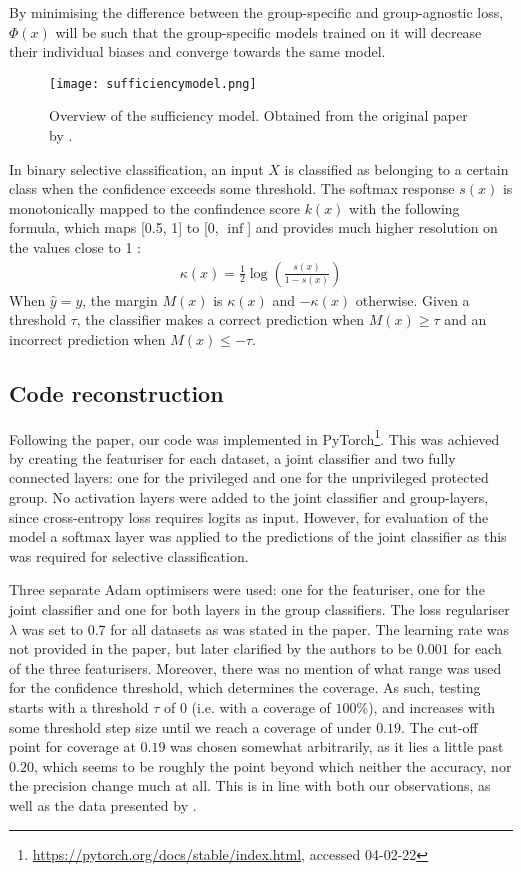 By minimising the difference between the group-specific and group-agnostic loss, $\Phi(x)$ will be such that the group-specific models trained on it will decrease their individual biases and converge towards the same model.
\begin{figure}[h!]
  \centering
  \texttt{[image: sufficiencymodel.png]}
    \caption{Overview of the sufficiency model. Obtained from the original paper by \citet{lee2021fair}.}
    \label{sufficiencymodel}
\end{figure}
In binary selective classification, an input $X$ is classified as belonging to a certain class when the confidence exceeds some threshold. The softmax response $s(x)$ is monotonically mapped to the confindence score $k(x)$ with the following formula, which maps [0.5, 1] to [0, $\inf$] and provides much higher resolution on the values close to 1 \citep{lee2021fair}:
\begin{align*}
    \kappa (x) = \frac{1}{2} \log \left( \frac{s(x)}{1-s(x)} \right)
\end{align*}
When $\hat{y} = y$, the margin $M(x)$ is $\kappa (x)$ and $-\kappa(x)$ otherwise. Given a threshold $\tau$, the classifier makes a correct prediction when $M(x) \geq \tau$ and an incorrect prediction when $M(x) \leq -\tau$.

\subsection{Code reconstruction}

Following the paper, our code was implemented in PyTorch\footnote{\url{https://pytorch.org/docs/stable/index.html}, accessed 04-02-22}. This was achieved by creating the featuriser for each dataset, a joint classifier and two fully connected layers: one for the privileged and one for the unprivileged protected group. No activation layers were added to the joint classifier and group-layers, since cross-entropy loss requires logits as input. However, for evaluation of the model a softmax layer was applied to the predictions of the joint classifier as this was required for selective classification.

Three separate Adam optimisers were used: one for the featuriser, one for the joint classifier and one for both layers in the group classifiers. The loss regulariser $\lambda$ was set to 0.7 for all datasets as was stated in the paper. The learning rate was not provided in the paper, but later clarified by the authors to be $0.001$ for each of the three featurisers. Moreover, there was no mention of what range was used for the confidence threshold, which determines the coverage. As such, testing starts with a threshold $\tau$ of $0$ (i.e. with a coverage of $100$\%), and increases with some threshold step size until we reach a coverage of under $0.19$. The cut-off point for coverage at $0.19$ was chosen somewhat arbitrarily, as it lies a little past $0.20$, which seems to be roughly the point beyond which neither the accuracy, nor the precision change much at all. This is in line with both our observations, as well as the data presented by \citet{lee2021fair}.


